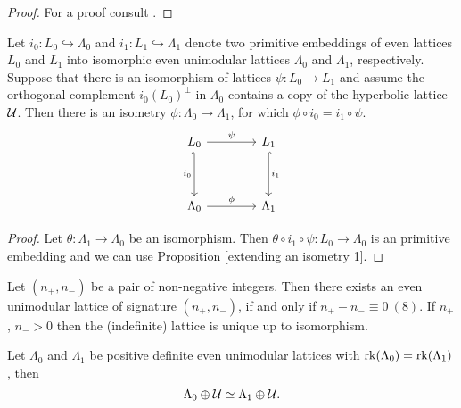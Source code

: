 \begin{proof}
    For a proof consult \cite[text]{keylist}.
\end{proof}

\begin{corollary}
    \label{extending an isometry 2}
    Let $i_0 \colon L_0 \hookrightarrow \Lambda_0$ and $i_1 \colon L_1 \hookrightarrow \Lambda_1$ denote two primitive embeddings of even lattices $L_0$ and $L_1$ into isomorphic even unimodular lattices $\Lambda_0$ and $\Lambda_1$, respectively. Suppose that there is an isomorphism of lattices $\psi \colon L_0 \to L_1$ and assume the orthogonal complement $i_0(L_0)^\perp$ in $\Lambda_0$ contains a copy of the hyperbolic lattice $\mathcal U$. Then there is an isometry $\phi \colon \Lambda_0 \to \Lambda_1$, for which $\phi \circ i_0 = i_1 \circ \psi$.
    \[\begin{tikzcd}[column sep = 2em]
        {L_0} && {L_1} \\
        \\
        \Lambda_0 && \Lambda_1
        \arrow["\psi", from=1-1, to=1-3]
        \arrow["{i_0}"', hook', from=1-1, to=3-1]
        \arrow["{i_1}", hook, from=1-3, to=3-3]
        \arrow["\phi", from=3-1, to=3-3]
    \end{tikzcd}\]
\end{corollary}

\begin{proof}
    Let $\theta \colon \Lambda_1 \to \Lambda_0$ be an isomorphism. Then $\theta \circ i_1 \circ \psi \colon L_0 \to \Lambda_0$ is an primitive embedding and we can use Proposition \ref{extending an isometry 1}.
\end{proof}

\begin{theorem}[Milnor]
    \label{Milnor}
    Let $(n_+,n_-)$ be a pair of non-negative integers. Then there exists an even unimodular lattice of signature $(n_+, n_-)$, if and only if $n_+ - n_- \equiv 0 \ (8)$. If $n_+$, $n_- > 0$ then the (indefinite) lattice is unique up to isomorphism.
\end{theorem}

\begin{corollary}
    Let $\Lambda_0$ and $\Lambda_1$ be positive definite even unimodular lattices with $\operatorname{rk}(\Lambda_0) = \operatorname{rk}(\Lambda_1)$, then
    \[
        \Lambda_0 \oplus \mathcal U \simeq \Lambda_1 \oplus \mathcal U.
    \]
\end{corollary}

